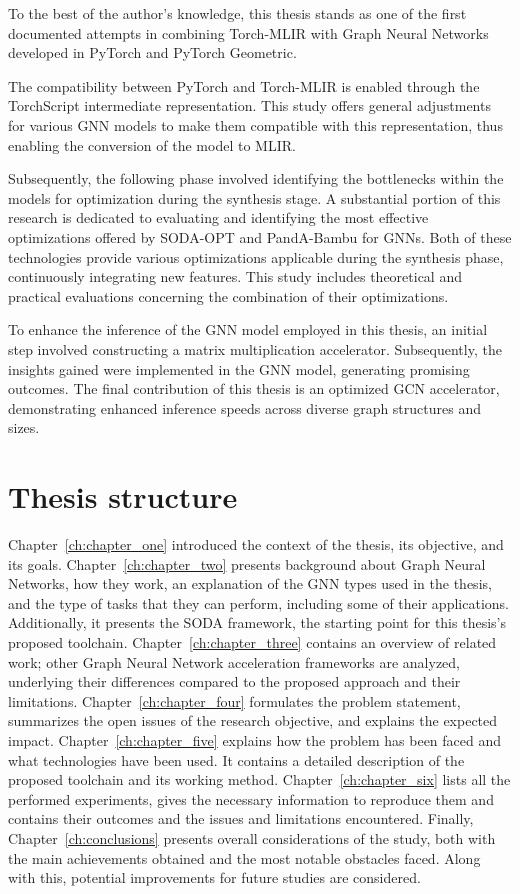 To the best of the author's knowledge, this thesis stands as one of the first documented attempts in combining Torch-MLIR with Graph Neural Networks developed in PyTorch and PyTorch Geometric.

The compatibility between PyTorch and Torch-MLIR is enabled through the TorchScript intermediate representation.
This study offers general adjustments for various GNN models to make them compatible with this representation, thus enabling the conversion of the model to MLIR\@.

Subsequently, the following phase involved identifying the bottlenecks within the models for optimization during the synthesis stage.
A substantial portion of this research is dedicated to evaluating and identifying the most effective optimizations offered by SODA-OPT and PandA-Bambu for GNNs.
Both of these technologies provide various optimizations applicable during the synthesis phase, continuously integrating new features.
This study includes theoretical and practical evaluations concerning the combination of their optimizations.

To enhance the inference of the GNN model employed in this thesis, an initial step involved constructing a matrix multiplication accelerator.
Subsequently, the insights gained were implemented in the GNN model, generating promising outcomes.
The final contribution of this thesis is an optimized GCN accelerator, demonstrating enhanced inference speeds across diverse graph structures and sizes.

\section{Thesis structure}
\label{sec:thesis_structure}%

Chapter~\ref{ch:chapter_one} introduced the context of the thesis, its objective, and its goals.
Chapter~\ref{ch:chapter_two} presents background about Graph Neural Networks, how they work, an explanation of the GNN types used in the thesis, and the type of tasks that they can perform, including some of their applications.
Additionally, it presents the SODA framework, the starting point for this thesis's proposed toolchain.
Chapter~\ref{ch:chapter_three} contains an overview of related work; other Graph Neural Network acceleration frameworks are analyzed, underlying their differences compared to the proposed approach and their limitations.
Chapter~\ref{ch:chapter_four} formulates the problem statement, summarizes the open issues of the research objective, and explains the expected impact.
Chapter~\ref{ch:chapter_five} explains how the problem has been faced and what technologies have been used.
It contains a detailed description of the proposed toolchain and its working method.
Chapter~\ref{ch:chapter_six} lists all the performed experiments, gives the necessary information to reproduce them and contains their outcomes and the issues and limitations encountered.
Finally, Chapter~\ref{ch:conclusions} presents overall considerations of the study, both with the main achievements obtained and the most notable obstacles faced.
Along with this, potential improvements for future studies are considered.